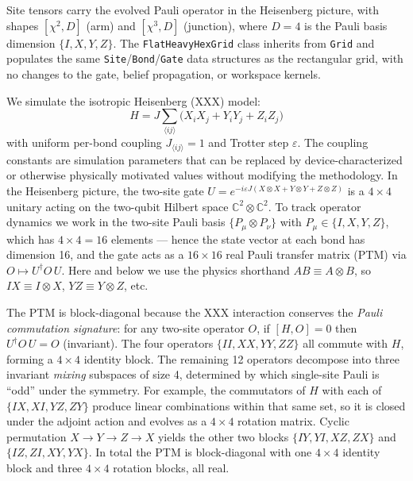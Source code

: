 \documentclass[12pt]{article}
\begin{document}
Site tensors carry the evolved Pauli operator in the Heisenberg picture,
with shapes $[\chi^2, D]$ (arm) and $[\chi^3, D]$ (junction),
where $D=4$ is the Pauli basis dimension $\{I, X, Y, Z\}$.
The \texttt{FlatHeavyHexGrid} class inherits from \texttt{Grid} and populates
the same \texttt{Site}/\texttt{Bond}/\texttt{Gate} data structures as the
rectangular grid, with no changes to the gate, belief propagation, or
workspace kernels.

We simulate the isotropic Heisenberg (XXX) model:
\begin{equation}
    H = J \sum_{\langle ij \rangle} \bigl(X_i X_j + Y_i Y_j + Z_i Z_j\bigr)
\end{equation}
with uniform per-bond coupling $J_{\langle ij\rangle} = 1$ and Trotter step $\varepsilon$.
The coupling constants are simulation parameters that can be replaced by
device-characterized or otherwise physically motivated values without
modifying the methodology.
In the Heisenberg picture, the two-site gate
$U = e^{-i\varepsilon J(X\otimes X + Y\otimes Y + Z\otimes Z)}$
is a $4\times4$ unitary acting on the two-qubit Hilbert space $\mathbb{C}^2\otimes\mathbb{C}^2$.
To track operator dynamics we work in the two-site Pauli basis
$\{P_\mu \otimes P_\nu\}$ with $P_\mu \in \{I,X,Y,Z\}$,
which has $4\times4 = 16$ elements — hence the state vector at each bond has
dimension 16, and the gate acts as a $16\times16$ real Pauli transfer matrix (PTM)
via $O \mapsto U^\dagger O\, U$.
Here and below we use the physics shorthand $AB \equiv A\otimes B$,
so $IX \equiv I\otimes X$, $YZ \equiv Y\otimes Z$, etc.

The PTM is block-diagonal because the XXX interaction conserves the
\emph{Pauli commutation signature}: for any two-site operator $O$,
if $[H, O] = 0$ then $U^\dagger O\, U = O$ (invariant).
The four operators $\{II, XX, YY, ZZ\}$ all commute with $H$,
forming a $4\times4$ identity block.
The remaining 12 operators decompose into three invariant
\emph{mixing} subspaces of size 4, determined by which single-site
Pauli is ``odd'' under the symmetry.
For example, the commutators of $H$ with each of
$\{IX, XI, YZ, ZY\}$ produce linear combinations
within that same set, so it is closed under the adjoint action
and evolves as a $4\times4$ rotation matrix.
Cyclic permutation $X\!\to\!Y\!\to\!Z\!\to\!X$ yields the other two blocks
$\{IY,YI,XZ,ZX\}$ and $\{IZ,ZI,XY,YX\}$.
In total the PTM is block-diagonal with one $4\times4$ identity block
and three $4\times4$ rotation blocks, all real.

\end{document}
